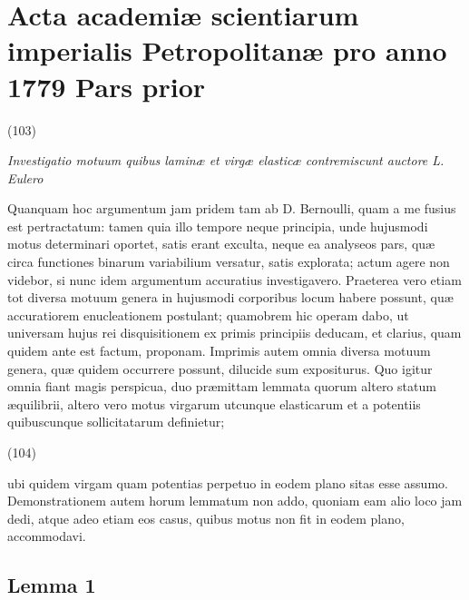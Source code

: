 \documentclass[11pt,a4paper]{article}
\begin{document}
\section{Acta academiæ scientiarum imperialis Petropolitanæ pro anno 1779 Pars prior}

(103)

\emph{Investigatio motuum quibus laminæ et virgæ elasticæ contremiscunt
auctore L. Eulero}

Quanquam hoc argumentum jam pridem tam ab  D.
Bernoulli, quam a me fusius est pertractatum: tamen quia illo tempore neque
principia, unde hujusmodi motus determinari oportet, satis erant exculta,
neque ea analyseos pars, quæ circa functiones binarum variabilium versatur,
satis explorata; actum agere non videbor, si nunc idem argumentum accuratius
investigavero. Praeterea vero etiam tot diversa motuum genera in hujusmodi
corporibus locum habere possunt, quæ accuratiorem enucleationem postulant;
quamobrem hic operam dabo, ut universam hujus rei disquisitionem ex primis
principiis deducam, et clarius, quam quidem ante est factum, proponam.
Imprimis autem omnia diversa motuum genera, quæ quidem occurrere possunt,
dilucide sum expositurus. Quo igitur omnia fiant magis perspicua, duo
præmittam lemmata quorum altero statum æquilibrii, altero vero motus
virgarum utcunque elasticarum et a potentiis quibuscunque 
sollicitatarum definietur;

(104)

ubi quidem  virgam quam potentias perpetuo in eodem plano sitas
 esse assumo. Demonstrationem autem horum lemmatum non addo,
quoniam eam alio loco jam dedi, atque adeo etiam  eos casus,
quibus motus non fit in eodem plano, accommodavi.

\subsection{Lemma 1}
\end{document}
